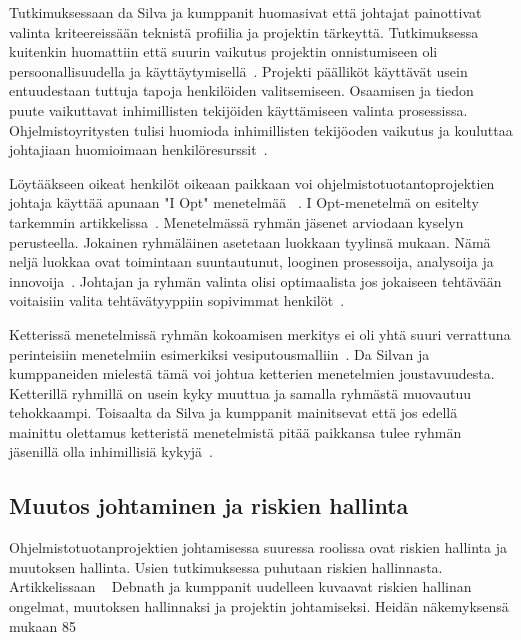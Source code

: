 \documentclass[finnish]{tktltiki2}
\theoremstyle{definition}
\theoremstyle{remark}
\begin{document}
Tutkimuksessaan da Silva ja kumppanit huomasivat että johtajat painottivat valinta kriteereissään teknistä profiilia ja  projektin tärkeyttä. Tutkimuksessa kuitenkin huomattiin että suurin vaikutus projektin onnistumiseen oli persoonallisuudella ja käyttäytymisellä~\cite{daSilva2012}. Projekti päälliköt käyttävät usein entuudestaan tuttuja tapoja henkilöiden valitsemiseen. Osaamisen ja tiedon puute vaikuttavat inhimillisten tekijöiden käyttämiseen valinta prosessissa. Ohjelmistoyritysten tulisi huomioda inhimillisten tekijöoden vaikutus ja kouluttaa johtajiaan huomioimaan henkilöresurssit~\cite{daSilva2012}. 

Löytääkseen oikeat henkilöt oikeaan paikkaan voi ohjelmistotuotantoprojektien johtaja käyttää apunaan "I Opt" menetelmää ~\cite{Dhomne:2012:ITL:2382887.2382899}. I Opt-menetelmä on esitelty tarkemmin artikkelissa~\cite{ kliem1996teambuilding}. Menetelmässä ryhmän jäsenet arviodaan kyselyn perusteella. Jokainen ryhmäläinen asetetaan luokkaan tyylinsä mukaan. Nämä neljä luokkaa ovat toimintaan suuntautunut, looginen prosessoija, analysoija ja innovoija~\cite{ kliem1996teambuilding}. Johtajan ja ryhmän valinta olisi optimaalista jos jokaiseen tehtävään voitaisiin valita tehtävätyyppiin sopivimmat henkilöt~\cite{Dhomne:2012:ITL:2382887.2382899}.

Ketterissä menetelmissä ryhmän kokoamisen merkitys ei oli yhtä suuri verrattuna perinteisiin menetelmiin esimerkiksi vesiputousmalliin~\cite{daSilva2012}. Da Silvan ja kumppaneiden mielestä tämä voi johtua ketterien menetelmien joustavuudesta. Ketterillä ryhmillä on usein kyky muuttua ja samalla ryhmästä muovautuu tehokkaampi. Toisaalta da Silva ja kumppanit mainitsevat että jos edellä mainittu olettamus ketteristä menetelmistä pitää paikkansa tulee ryhmän jäsenillä olla inhimillisiä kykyjä~\cite{daSilva2012}. 


\subsection{Muutos johtaminen ja riskien hallinta}

Ohjelmistotuotanprojektien johtamisessa suuressa roolissa ovat riskien hallinta ja muutoksen hallinta. Usien tutkimuksessa puhutaan riskien hallinnasta. Artikkelissaan ~\cite{4017705} Debnath ja kumppanit uudelleen kuvaavat riskien hallinan ongelmat, muutoksen hallinnaksi ja projektin johtamiseksi. Heidän näkemyksensä mukaan 85%
\end{document}
